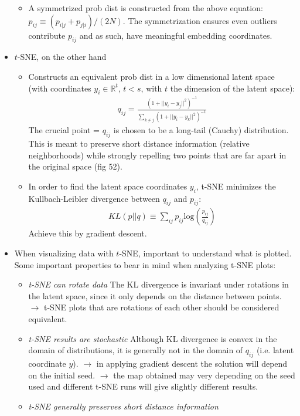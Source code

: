 \documentclass[norsk,a4paper,11pt]{article}
\begin{document}
\begin{itemize}
\begin{itemize}
		\item A symmetrized prob dist is constructed from the above equation: $p_{ij} \equiv (p_{i|j} + p_{j|i})/(2N)$. The symmetrization ensures even outliers contribute $p_{ij}$ and as such, have meaningful embedding coordinates.
	\end{itemize}
	\item $t$-SNE, on the other hand
	\begin{itemize}
		\item Constructs an equivalent prob dist in a low dimensional latent space (with coordinates $y_i \in \mathbb{R}^t$, $t<s$, with $t$ the dimension of the latent space):
		\begin{align}
			q_{ij} = \frac{(1 + ||y_i -y_j||^2)^{-1}}{\sum_{k\neq j} (1+||y_i - y_k||^2)^{-1}}
		\end{align}
		The crucial point = $q_{ij}$ is chosen to be a long-tail (Cauchy) distribution. This is meant to preserve short distance information (relative neighborhoods) while strongly repelling two points that are far apart in the original space (fig 52). 
		\item In order to find the latent space coordinates $y_i$, t-SNE minimizes the Kullbach-Leibler divergence between $q_{ij}$ and $p_{ij}$:
		\begin{align}
			KL(p||q) \equiv \sum_{ij} p_{ij} \text{log} (\frac{p_{ij}}{q_{ij}})
		\end{align}
		Achieve this by gradient descent. 
	\end{itemize}
	\item When visualizing data with $t$-SNE, important to understand what is plotted. Some important properties to bear in mind when analyzing t-SNE plots:
	\begin{itemize}
		\item \textit{t-SNE can rotate data}
		The KL divergence is invariant under rotations in the latent space, since it only depends on the distance between points. $\rightarrow$ t-SNE plots that are rotations of each other should be considered equivalent.
		\item \textit{t-SNE results are stochastic}
		Although KL divergence is convex in the domain of distributions, it is generally not in the domain of $q_{ij}$ (i.e. latent coordinate $y$). $\rightarrow$ in applying gradient descent the solution will depend on the initial seed. $\rightarrow$ the map obtained may very depending on the seed used and different t-SNE runs will give slightly different results.
		\item \textit{t-SNE generally preserves short distance information}

\end{itemize}
\end{itemize}
\end{document}

